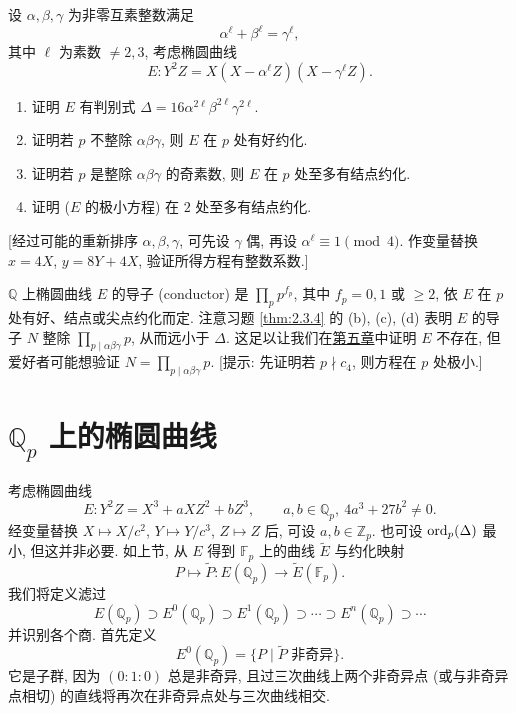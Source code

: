 \begin{exercise} \label{thm:2.3.4} 
设 $\alpha,\beta,\gamma$ 为非零互素整数满足
\[
\alpha^\ell + \beta^\ell = \gamma^\ell,
\]
其中 $\ell$ 为素数 $\neq 2,3$, 考虑椭圆曲线
\[
E\colon Y^2Z = X(X - \alpha^\ell Z)(X - \gamma^\ell Z).
\]
\begin{enumerate}[label=\textup{(\alph*)}]
\item 证明 $E$ 有判别式 $\Delta = 16\alpha^{2\ell}\beta^{2\ell}\gamma^{2\ell}$.
\item 证明若 $p$ 不整除 $\alpha\beta\gamma$, 则 $E$ 在 $p$ 处有好约化.
\item 证明若 $p$ 是整除 $\alpha\beta\gamma$ 的奇素数, 则 $E$ 在 $p$ 处至多有结点约化.
\item 证明 ($E$ 的极小方程) 在 $2$ 处至多有结点约化.
\end{enumerate}
[经过可能的重新排序 $\alpha,\beta,\gamma$, 可先设 $\gamma$ 偶, 再设 $\alpha^\ell\equiv 1\pmod{4}$. 作变量替换 $x = 4X$, $y = 8Y + 4X$, 验证所得方程有整数系数.]
\end{exercise}

\begin{aside} \label{thm:2.3.5} 
$\mathbb{Q}$ 上椭圆曲线 $E$ 的导子 (conductor) 是 $\prod_p p^{f_p}$, 其中 $f_p = 0, 1$ 或 $\ge 2$, 依 $E$ 在 $p$ 处有好、结点或尖点约化而定. 注意习题 \ref{thm:2.3.4} 的 (b), (c), (d) 表明 $E$ 的导子 $N$ 整除 $\prod_{p\mid\alpha\beta\gamma}p$, 从而远小于 $\Delta$. 这足以让我们在\hyperref[ch:5]{第五章}中证明 $E$ 不存在, 但爱好者可能想验证 $N = \prod_{p\mid\alpha\beta\gamma}p$. [提示: 先证明若 $p\nmid c_4$, 则方程在 $p$ 处极小.]
\end{aside}

\section{\texorpdfstring{$\mathbb{Q}_p$ 上的椭圆曲线}{Qp 上的椭圆曲线}}\label{sec:2.4}

考虑椭圆曲线
\[
E\colon Y^2Z = X^3 + aXZ^2 + bZ^3, \qquad a,b\in\mathbb{Q}_p, \ 4a^3 + 27b^2\neq 0.
\]
经变量替换 $X\mapsto X/c^2$, $Y\mapsto Y/c^3$, $Z\mapsto Z$ 后, 可设 $a,b\in\mathbb{Z}_p$. 也可设 $\operatorname*{ord}\nolimits_p(\Delta)$ 最小, 但这并非必要. 如上节, 从 $E$ 得到 $\mathbb{F}_p$ 上的曲线 $\tilde{E}$ 与约化映射
\[
P\mapsto\tilde{P}\colon E(\mathbb{Q}_p)\to\tilde{E}(\mathbb{F}_p).
\]
我们将定义滤过
\[
E(\mathbb{Q}_p)\supset E^0(\mathbb{Q}_p)\supset E^1(\mathbb{Q}_p)\supset\cdots\supset E^n(\mathbb{Q}_p)\supset\cdots
\]
并识别各个商. 首先定义
\[
E^0(\mathbb{Q}_p) = \{P \mid \tilde{P} \text{ 非奇异}\}.
\]
它是子群, 因为 $(0:1:0)$ 总是非奇异, 且过三次曲线上两个非奇异点 (或与非奇异点相切) 的直线将再次在非奇异点处与三次曲线相交.

